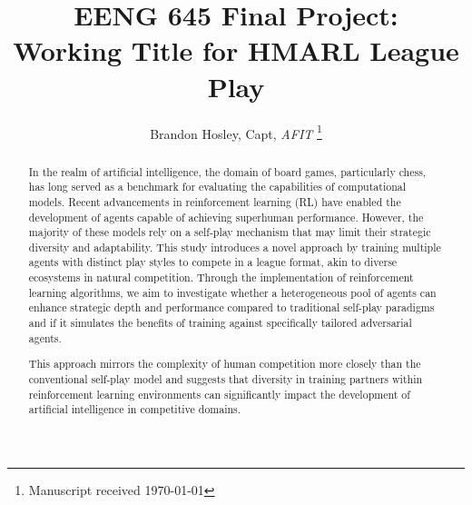 \documentclass[journal]{IEEEtran}
\title{EENG 645 Final Project: \\Working Title for HMARL League Play}
\author{Brandon Hosley, Capt, \textit{AFIT}%
	\thanks{Manuscript received \today%
}}
\begin{document}
	
	\maketitle
	
	
	\begin{abstract}
		
		In the realm of artificial intelligence, the domain of board games, particularly chess, 
		has long served as a benchmark for evaluating the capabilities of computational models. 
		Recent advancements in reinforcement learning (RL) have enabled the development of 
		agents capable of achieving superhuman performance. 
		However, the majority of these models rely on a self-play mechanism 
		that may limit their strategic diversity and adaptability. 
		This study introduces a novel approach by training multiple agents with distinct 
		play styles to compete in a league format, akin to diverse ecosystems in natural competition. 
		Through the implementation of reinforcement learning algorithms, 
		we aim to investigate whether a heterogeneous pool of agents can enhance strategic depth 
		and performance compared to traditional self-play paradigms and if it simulates the benefits of 
		training against specifically tailored adversarial agents. 
		\begin{comment}
		We developed several agents, each with a unique play style—aggressive, defensive, positional, and tactical—trained within a multi-agent reinforcement learning framework. 
		The performance of these agents was evaluated based on their win rates, Elo ratings, Glicko ratings, and their ability to adapt and counter a variety of opponent strategies. 
		Our results indicate that the inclusion of diverse play styles not only elevates the overall performance of individual agents in league play but also encourages the emergence of innovative strategies and adaptability.
		\end{comment}
		This approach mirrors the complexity of human competition more closely than the conventional self-play model and suggests that diversity in training partners within reinforcement learning environments can significantly impact the development of artificial intelligence in competitive domains.
		
	\end{abstract}
	
\end{document}
